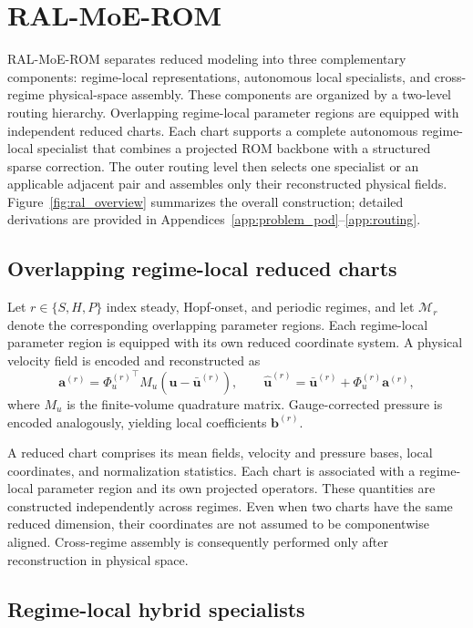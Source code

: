 \documentclass{article}
\begin{document}
\section{RAL-MoE-ROM}
\label{sec:method}

RAL-MoE-ROM separates reduced modeling into three complementary components: regime-local representations, autonomous local specialists, and
cross-regime physical-space assembly. These components are organized by a two-level routing hierarchy. Overlapping regime-local parameter regions are equipped with independent reduced charts. Each chart supports a complete autonomous regime-local specialist that combines a projected ROM backbone with a structured sparse correction. The outer routing level then selects one specialist or an applicable adjacent pair and assembles only their reconstructed physical fields. Figure~\ref{fig:ral_overview} summarizes the overall construction; detailed
derivations are provided in Appendices~\ref{app:problem_pod}--\ref{app:routing}.

\subsection{Overlapping regime-local reduced charts}

Let $r\in\{S,H,P\}$ index steady, Hopf-onset, and periodic regimes, and let $\mathcal M_r$ denote the corresponding overlapping parameter regions. Each regime-local parameter region is equipped with its own reduced coordinate system. A physical velocity field is encoded and reconstructed as
\begin{equation}
  \bm a^{(r)}={\Phi_u^{(r)}}^{\top}M_u(\bm u-\bar{\bm u}^{(r)}),\qquad
  \widehat{\bm u}^{(r)}=\bar{\bm u}^{(r)}+\Phi_u^{(r)}\bm a^{(r)},
  \label{eq:main_chart}
\end{equation}
where $M_u$ is the finite-volume quadrature matrix. Gauge-corrected pressure is encoded analogously, yielding local coefficients
$\bm b^{(r)}$. 

A reduced chart comprises its mean fields, velocity and pressure bases, local coordinates, and normalization statistics. Each chart is associated with a regime-local parameter region and its own projected operators.
These quantities are constructed independently across regimes. Even when two charts have the same reduced dimension, their coordinates are not assumed to be componentwise aligned. Cross-regime assembly is consequently performed only after reconstruction in physical space.

\subsection{Regime-local hybrid specialists}
\end{document}

